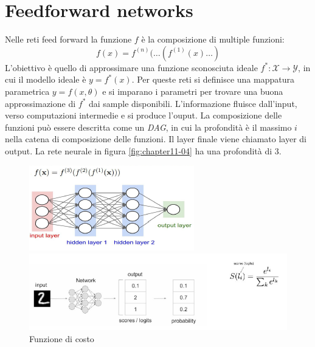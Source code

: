 \section{Feedforward networks}
Nelle reti feed forward la funzione $f$ \`e la composizione di multiple funzioni:
$$f(x) = f^{(n)}(\dots(f^{(1)}(x)\dots)$$
L'obiettivo \`e quello di approssimare una funzione sconosciuta ideale $f^*:\mathcal{X}\rightarrow\mathcal{Y}$, in cui il modello ideale \`e $y = f^*(x)$.
Per queste reti si definisce una mappatura parametrica $y = f(x,\theta)$ e si imparano i parametri per trovare una buona approssimazione di $f^*$ dai sample disponibili.
L'informazione fluisce dall'input, verso computazioni intermedie e si produce l'ouput.
La composizione delle funzioni pu\`o essere descritta come un \emph{DAG}, in cui la profondit\`a \`e il massimo $i$ nella catena di composizione delle funzioni.
Il layer finale viene chiamato layer di output. 
La rete neurale in figura \ref{fig:chapter11-04} ha una profondit\`a di 3.
\begin{figure}
	\centering
	\begin{minipage}{.5\textwidth}
		\centering
		\includegraphics[width=0.8\linewidth]{imgs/chapter11/img4}
		\caption{}
		\label{fig:chapter11-04}
	\end{minipage}%
	\begin{minipage}{.5\textwidth}
		\centering
		\includegraphics[width=1\linewidth]{imgs/chapter11/img5}
		\caption{Funzione di costo}
		\label{fig:chapter11-05}
	\end{minipage}
\end{figure}



